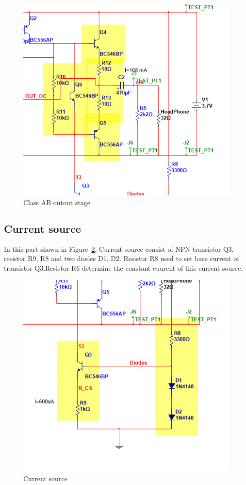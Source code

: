 \begin{figure}[htbp]
	\centering
	\includegraphics[scale=0.8]{"../Photo/Chap5/Class AB outout stage"}
	\caption{Class AB outout stage}
	\label{fig:Class AB outout stage}
\end{figure}

\subsection{Current source }  
In this part shown in Figure~\ref{fig:Current source}, Current source consist of NPN transistor Q3, resistor R9, R8 and two diodes D1, D2.
Resistor R8 used to set base current of transistor Q3.Resistor R6 determine the constant cuurent of this current source.

\begin{figure}[htbp]
	\centering
	\includegraphics[scale=0.8]{"../Photo/Chap5/Current source"}
	\caption{Current source}
	\label{fig:Current source}
\end{figure}

